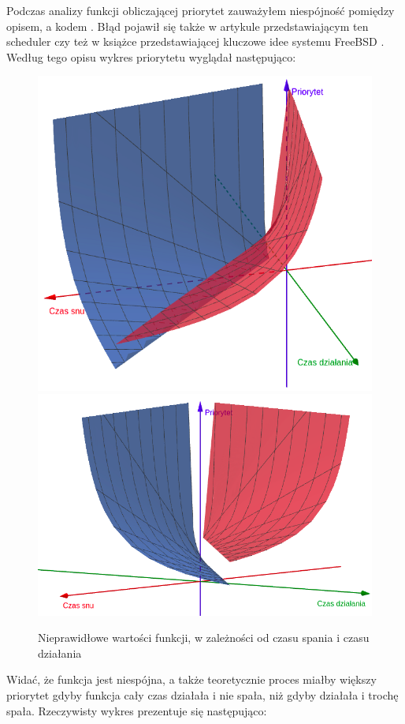 \documentclass[shortabstract]{iithesis}
\theoremstyle{definition} \newtheorem*{definition}{Definicja}
\theoremstyle{definition} \newtheorem*{example}{Przykład}
\theoremstyle{definition} \newtheorem*{remark}{Uwaga}
\begin{document}
Podczas analizy funkcji obliczającej priorytet zauważyłem niespójność pomiędzy opisem, a kodem  \cite{bib:ulepr}. Błąd pojawił się także w artykule przedstawiającym ten scheduler \cite{bib:ule} czy też w książce przedstawiającej kluczowe idee systemu FreeBSD \cite{bib:freebsd-os}. Według tego opisu wykres priorytetu wyglądał następująco:

\begin{figure}[H]
\centering
  \centering
  \includegraphics[width=.48\linewidth]{images/ule1.png}
  \label{fig:ule1}
  \centering
  \includegraphics[width=.49 \linewidth]{images/ule2.png}
  \label{fig:ule2}
\caption{Nieprawidłowe wartości funkcji, w zależności od czasu spania i czasu działania}
\label{fig:ule11}
\end{figure}

Widać, że funkcja jest niespójna, a także teoretycznie proces miałby większy priorytet gdyby funkcja cały czas działała i nie spała, niż gdyby działała i trochę spała.
Rzeczywisty wykres prezentuje się następująco:
\end{document}
